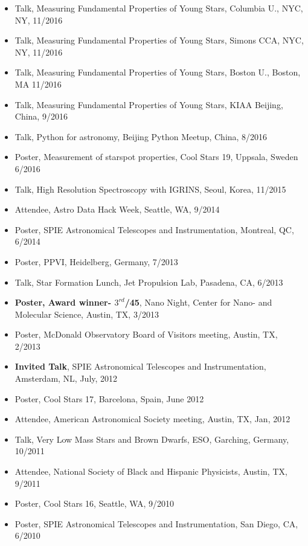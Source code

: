 \documentclass[10pt,letterpaper]{article}
\begin{document}
\begin{itemize}
    \item Talk, Measuring Fundamental Properties of Young Stars, Columbia U., NYC, NY, 11/2016
    \item Talk, Measuring Fundamental Properties of Young Stars, Simons CCA, NYC, NY, 11/2016
    \item Talk, Measuring Fundamental Properties of Young Stars, Boston U., Boston, MA 11/2016
    \item Talk, Measuring Fundamental Properties of Young Stars, KIAA Beijing, China, 9/2016
    \item Talk, Python for astronomy, Beijing Python Meetup, China, 8/2016
    \item Poster, Measurement of starspot properties, Cool Stars 19, Uppsala, Sweden 6/2016
    \item Talk, High Resolution Spectroscopy with IGRINS, Seoul, Korea, 11/2015
    \item Attendee, Astro Data Hack Week, Seattle, WA, 9/2014
    \item Poster, SPIE Astronomical Telescopes and Instrumentation, Montreal, QC, 6/2014
    \item Poster, PPVI, Heidelberg, Germany, 7/2013
    \item Talk, Star Formation Lunch, Jet Propulsion Lab, Pasadena, CA, 6/2013
    \item \textbf{Poster, Award winner- $3^{rd}$/45}, Nano Night, Center for Nano- and Molecular Science, Austin, TX, 3/2013
    \item Poster, McDonald Observatory Board of Visitors meeting, Austin, TX, 2/2013 
    \item \textbf{Invited Talk}, SPIE Astronomical Telescopes and Instrumentation, Amsterdam, NL, July, 2012
    \item Poster, Cool Stars 17, Barcelona, Spain, June 2012
    \item Attendee, American Astronomical Society meeting, Austin, TX, Jan, 2012
    \item Talk, Very Low Mass Stars and Brown Dwarfs, ESO, Garching, Germany, 10/2011
    \item Attendee, National Society of Black and Hispanic Physicists, Austin, TX, 9/2011
    \item Poster, Cool Stars 16, Seattle, WA, 9/2010
    \item Poster, SPIE Astronomical Telescopes and Instrumentation, San Diego, CA, 6/2010
\end{itemize}
\end{document}
